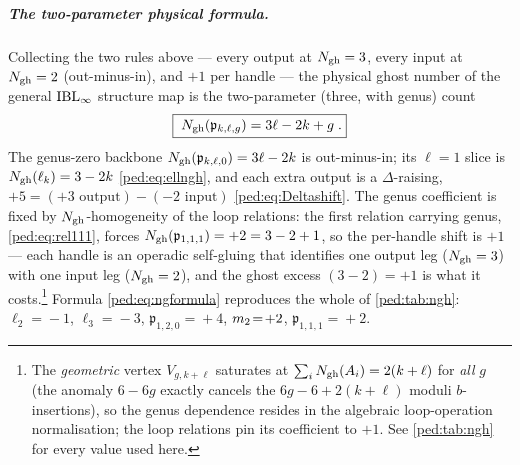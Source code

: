 \subparagraph{The two-parameter physical formula.} Collecting the two rules above --- every
output at $N_{\text{gh}}=3$, every input at $N_{\text{gh}}=2$ (out-minus-in), and $+1$ per handle --- the
physical ghost number of the general $\mathrm{IBL}_\infty$ structure map is the two-parameter (three, with
genus) count
\begin{equation}
  \boxed{\;N_{\text{gh}}(\mathfrak{p}_{k,\ell,g})=3\ell-2k+g\;.}
  \label{ped:eq:ngformula}
\end{equation}
The genus-zero backbone $N_{\text{gh}}(\mathfrak p_{k,\ell,0})=3\ell-2k$ is out-minus-in; its
$\ell=1$ slice is $N_{\text{gh}}(\ell_k)=3-2k$ \eqref{ped:eq:ellngh}, and each extra output is a
$\Delta$-raising, $+5=(+3\text{ output})-(-2\text{ input})$ \eqref{ped:eq:Deltashift}. The genus
coefficient is fixed by $N_{\text{gh}}$-homogeneity of the loop relations: the first relation
carrying genus, \eqref{ped:eq:rel111}, forces $N_{\text{gh}}(\mathfrak p_{1,1,1})=+2=3-2+1$, so the
per-handle shift is $+1$ --- each handle is an operadic self-gluing that identifies one
output leg ($N_{\text{gh}}=3$) with one input leg ($N_{\text{gh}}=2$), and the ghost excess $(3-2)=+1$ is what
it costs.\footnote{The \emph{geometric} vertex $V_{g,k+\ell}$ saturates at
$\sum_iN_{\text{gh}}(A_i)=2(k+\ell)$ for \emph{all} $g$ (the anomaly $6-6g$ exactly cancels the
$6g-6+2(k+\ell)$ moduli $b$-insertions), so the genus dependence resides in the algebraic
loop-operation normalisation; the loop relations pin its coefficient to $+1$. See
\cref{ped:tab:ngh} for every value used here.} Formula \eqref{ped:eq:ngformula} reproduces the whole
of \cref{ped:tab:ngh}: $\ell_2\!=\!-1$, $\ell_3\!=\!-3$, $\mathfrak p_{1,2,0}\!=\!+4$,
$m_2\!=\!+2$, $\mathfrak p_{1,1,1}\!=\!+2$.

